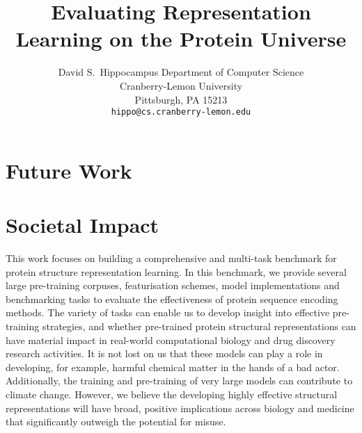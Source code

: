 \documentclass{article}
\title{Evaluating Representation Learning on the Protein Universe}
\author{%
  David S.~Hippocampus%
  Department of Computer Science\\
  Cranberry-Lemon University\\
  Pittsburgh, PA 15213 \\
  \texttt{hippo@cs.cranberry-lemon.edu} \\
}
\begin{document}
\maketitle

\begin{abstract}

\end{abstract}









\section{Future Work}


\section{Societal Impact}
This work focuses on building a comprehensive and multi-task benchmark for protein structure representation learning. In this benchmark, we provide several large pre-training corpuses, featurisation schemes, model implementations and benchmarking tasks to evaluate the effectiveness of protein sequence encoding methods. The variety of tasks can enable us to develop insight into effective pre-training strategies, and whether pre-trained protein structural representations can have material impact in real-world computational biology and drug discovery research activities. It is not lost on us that these models can play a role in developing, for example, harmful chemical matter in the hands of a bad actor. Additionally, the training and pre-training of very large models can contribute to climate change. However, we believe the developing highly effective structural representations will have broad, positive implications across biology and medicine that significantly outweigh the potential for misuse.

%




%
\end{document}
